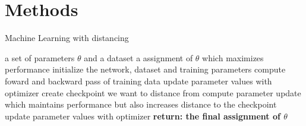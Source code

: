\documentclass[
a4paper, 12pt, %
titlepage, 		 %
twoside,			 %
headsepline,	 %
BCOR5mm,			 %
idxtotoc, bibtotoc]{scrreprt}	%
\begin{document}
\chapter{Methods}
\begin{algorithm}\label{alg:Distance_Motivation}
    \begin{algorithmic}[1]
        \caption{Machine Learning with distancing}
        \REQUIRE a set of parameters $\theta$ and a dataset
        \ENSURE a assignment of $\theta$ which maximizes performance
        \STATE initialize the network, dataset and training parameters
            \STATE compute foward and backward pass of training data
            \STATE update parameter values with optimizer
        \ENDFOR
        \STATE create checkpoint we want to distance from
			\STATE compute parameter update which maintains performance but also increases distance to the checkpoint
			\ENDFOR
		\STATE update parameter values with optimizer
        \ENDFOR
        \STATE \textbf{return: the final assignment of $\theta$}
    \end{algorithmic}
\end{algorithm}
\end{document}
